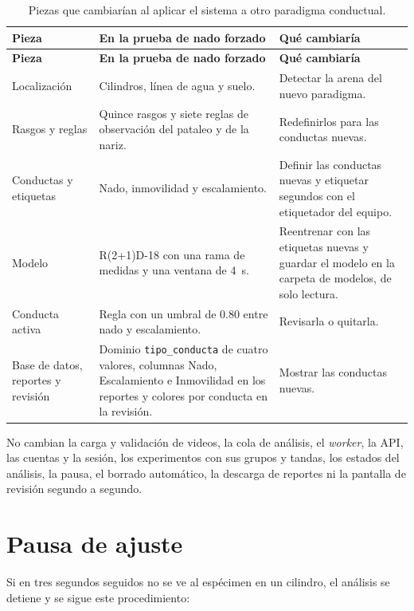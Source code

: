 {\footnotesize\singlespacing
\begin{longtable}{|>{\raggedright}p{3.2cm}|>{\raggedright}p{5.3cm}|>{\raggedright\arraybackslash}p{5.5cm}|}
\caption{Piezas que cambiarían al aplicar el sistema a otro paradigma conductual.
\label{tab:adaptacion_paradigma}}\\
\hline
\textbf{Pieza} & \textbf{En la prueba de nado forzado} & \textbf{Qué cambiaría} \\
\hline
\endfirsthead
\hline
\textbf{Pieza} & \textbf{En la prueba de nado forzado} & \textbf{Qué cambiaría} \\
\hline
\endhead
Localización
& Cilindros, línea de agua y suelo.
& Detectar la arena del nuevo paradigma. \\
\hline
Rasgos y reglas
& Quince rasgos y siete reglas de observación del pataleo y de la nariz.
& Redefinirlos para las conductas nuevas. \\
\hline
Conductas y etiquetas
& Nado, inmovilidad y escalamiento.
& Definir las conductas nuevas y etiquetar segundos con el etiquetador del equipo. \\
\hline
Modelo
& R(2+1)D-18 con una rama de medidas y una ventana de 4~s.
& Reentrenar con las etiquetas nuevas y guardar el modelo en la carpeta de modelos, de solo lectura. \\
\hline
Conducta activa
& Regla con un umbral de 0.80 entre nado y escalamiento.
& Revisarla o quitarla. \\
\hline
Base de datos, reportes y revisión
& Dominio \texttt{tipo\_conducta} de cuatro valores, columnas Nado, Escalamiento e Inmovilidad en los reportes y colores por conducta en la revisión.
& Mostrar las conductas nuevas. \\
\hline
\end{longtable}
}

No cambian la carga y validación de videos, la cola de análisis, el \textit{worker}, la API, las cuentas y la
sesión, los experimentos con sus grupos y tandas, los estados del análisis, la pausa, el borrado automático, la
descarga de reportes ni la pantalla de revisión segundo a segundo.

\section{Pausa de ajuste}
\label{sec:pausa}

Si en tres segundos seguidos no se ve al espécimen en un cilindro, el análisis se detiene y se sigue este
procedimiento:

